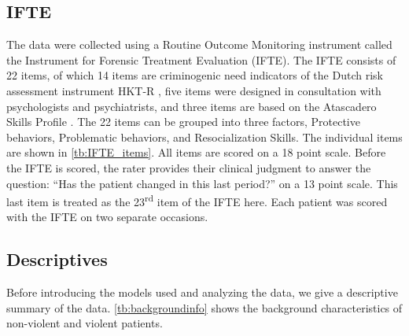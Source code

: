 \documentclass[a4paper,11pt]{article}
\newcommand{\DB}[1]{\todo[inline, color=colorDon]{DB: {#1}}}
\begin{document}
\subsection{IFTE}
The data were collected using a Routine Outcome Monitoring instrument called the Instrument for Forensic Treatment Evaluation (IFTE).
The IFTE consists of 22 items, of which 14 items are criminogenic need indicators of the Dutch risk assessment instrument HKT-R \parencite{spreen2013handleiding}, five items were designed in consultation with psychologists and psychiatrists, and three items are based on the Atascadero Skills Profile \parencite{vess2001development}.
The 22 items can be grouped into three factors, Protective behaviors, Problematic behaviors, and Resocialization Skills.
The individual items are shown in \autoref{tb:IFTE_items}.
All items are scored on a 18 point scale.
Before the IFTE is scored, the rater provides their clinical judgment to answer the question: ``Has the patient changed in this last period?'' on a 13 point scale.
This last item is treated as the 23\textsuperscript{rd} item of the IFTE here.
Each patient was scored with the IFTE on two separate occasions.




\subsection{Descriptives}
Before introducing the models used and analyzing the data, we give a descriptive summary of the data.
\autoref{tb:backgroundinfo} shows the background characteristics of non-violent and violent patients.
\end{document}
